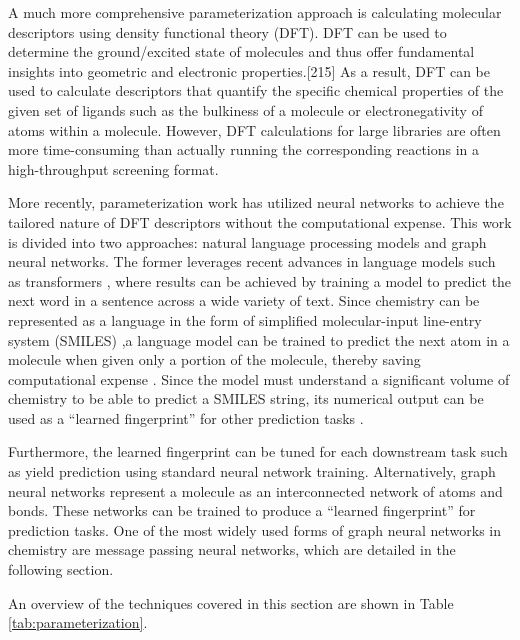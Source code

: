 A much more comprehensive parameterization approach is calculating molecular descriptors using density functional theory (DFT). DFT can be used to determine the ground/excited state of molecules and thus offer fundamental insights into geometric and electronic properties.[215] As a result, DFT can be used to calculate descriptors that quantify the specific chemical properties of the given set of ligands such as the bulkiness of a molecule or electronegativity of atoms within a molecule. However, DFT calculations for large libraries are often more time-consuming than actually running the corresponding reactions in a high-throughput screening format.

More recently, parameterization work has utilized neural networks to achieve the tailored nature of DFT descriptors without the computational expense. This work is divided into two approaches: natural language processing models and graph neural networks. The former leverages recent advances in language models such as transformers \cite{Vaswani2017}, where results can be achieved by training a model to predict the next word in a sentence across a wide variety of text. Since chemistry can be represented as a language in the form of simplified molecular-input line-entry system (SMILES) \cite{Weininger1988} ,a language model can be trained to predict the next atom in a molecule when given only a portion of the molecule, thereby saving computational expense \cite{Schwaller2019}. Since the model must understand a significant volume of chemistry to be able to predict a SMILES string, its numerical output can be used as a “learned fingerprint” for other prediction tasks \cite{Schwaller2021}.

Furthermore, the learned fingerprint can be tuned for each downstream task such as yield prediction using standard neural network training. Alternatively, graph neural networks represent a molecule as an interconnected network of atoms and bonds. These networks can be trained to produce a “learned fingerprint” for prediction tasks. One of the most widely used forms of graph neural networks in chemistry are message passing neural networks, which are detailed in the following section.

An overview of the techniques covered in this section are shown in Table \ref{tab:parameterization}.

